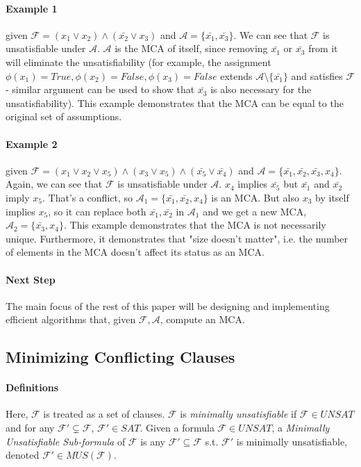 \documentclass[]{article}
\begin{document}
	\paragraph{Example 1 } given  $\mathcal{F} = (x_1 \lor x_2) \land (\bar{x_2} \lor x_3)$ and $\mathcal{A} =\{\bar{x_1}, \bar{x_3}\}$. We can see that $ \mathcal{F} $ is unsatisfiable under $ \mathcal{A} $. $ \mathcal{A} $ is the MCA of itself, since removing $\bar{x_1}$ or $\bar{x_3}$ from it will eliminate the unsatisfiability (for example, the assignment $ \phi(x_1)=True,\phi(x_2)=False, \phi(x_3)=False $ extends $ \mathcal{A} \setminus \{\bar{x_1}\} $ and satisfies $\mathcal{F}$ - similar argument can be used to show that $\bar{x_3}$ is also necessary for the unsatisfiability). This example demonstrates that the MCA can be equal to the original set of assumptions.
	\paragraph{Example 2 } given  $\mathcal{F} = (x_1 \lor x_2 \lor x_5) \land (x_3 \lor x_5) \land (\bar{x_5} \lor \bar{x_4})$ and $\mathcal{A} =\{\bar{x_1}, \bar{x_2}, \bar{x_3}, x_4\}$. Again, we can see that $ \mathcal{F} $ is unsatisfiable under $ \mathcal{A} $. $ x_4 $ implies $ \bar{x_5} $ but $\bar{x_1}$ and $ \bar{x_2}$ imply $ x_5 $. That's a conflict, so $\mathcal{A}_1 =\{\bar{x_1}, \bar{x_2}, x_4\}$ is an MCA. But also $ x_3 $ by itself implies $ x_5 $, so it can replace both $ \bar{x_1}, \bar{x_2} $ in $ \mathcal{A}_1 $ and we get a new MCA, $\mathcal{A}_2 =\{\bar{x_3}, x_4\}$. 
	This example demonstrates that the MCA is not necessarily unique. Furthermore, it demonstrates that "size doesn't matter", i.e. the number of elements in the MCA doesn't affect its status as an MCA.
	
	\paragraph{Next Step} The main focus of the rest of this paper will be designing and implementing efficient algorithms that, given $\mathcal{F}, \mathcal{A}$, compute an MCA.
	
	\subsection[Similar Problem]{Minimizing Conflicting Clauses}
	\paragraph{Definitions} Here, $ \mathcal{F} $ is treated as a set of clauses. $ \mathcal{F} $ is \textit{minimally unsatisfiable} if $ \mathcal{F} \in UNSAT $ and for any $ \mathcal{F}' \subsetneq \mathcal{F} $, $ \mathcal{F}' \in SAT$. Given a formula $ \mathcal{F} \in UNSAT $, a \textit{Minimally Unsatisfiable Sub-formula} of $ \mathcal{F} $ is any $ \mathcal{F}' \subseteq \mathcal{F} $ s.t. $ \mathcal{F}' $ is minimally unsatisfiable, denoted $ \mathcal{F}' \in MUS(\mathcal{F}) $.
\end{document}
